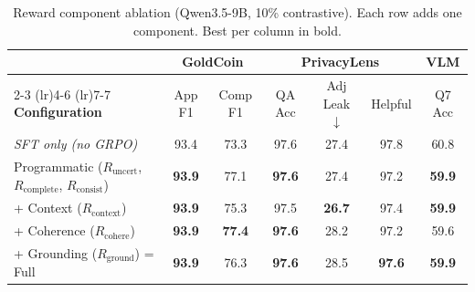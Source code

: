 \begin{table}[ht]
\centering
\caption{Reward component ablation (Qwen3.5-9B, 10\% contrastive). Each row adds one component. Best per column in bold.}
\label{tab:reward-ablation}
\begin{tabular}{lcccccc}
\toprule
 & \multicolumn{2}{c}{\textbf{GoldCoin}} & \multicolumn{3}{c}{\textbf{PrivacyLens}} & \multicolumn{1}{c}{\textbf{VLM}} \\
\cmidrule(lr){2-3} \cmidrule(lr){4-6} \cmidrule(lr){7-7}
\textbf{Configuration} & App F1 & Comp F1 & QA Acc & Adj Leak $\downarrow$ & Helpful & Q7 Acc \\
\midrule
\textit{SFT only (no GRPO)} & 93.4 & 73.3 & 97.6 & 27.4 & 97.8 & 60.8 \\
\midrule
Programmatic ($R_{\text{uncert}}$, $R_{\text{complete}}$, $R_{\text{consist}}$) & \textbf{93.9} & 77.1 & \textbf{97.6} & 27.4 & 97.2 & \textbf{59.9} \\
+ Context ($R_{\text{context}}$) & \textbf{93.9} & 75.3 & 97.5 & \textbf{26.7} & 97.4 & \textbf{59.9} \\
+ Coherence ($R_{\text{cohere}}$) & \textbf{93.9} & \textbf{77.4} & \textbf{97.6} & 28.2 & 97.2 & 59.6 \\
+ Grounding ($R_{\text{ground}}$) = Full & \textbf{93.9} & 76.3 & \textbf{97.6} & 28.5 & \textbf{97.6} & \textbf{59.9} \\
\bottomrule
\end{tabular}
\end{table}